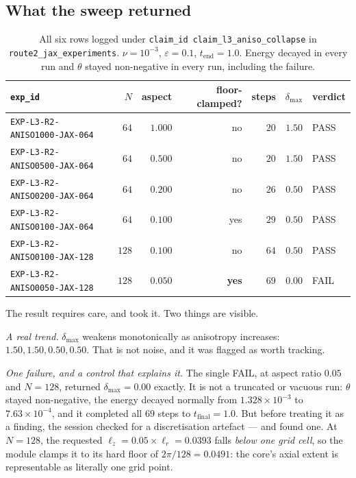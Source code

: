 \subsection{What the sweep returned}

\begin{table}[ht]
\centering
\small
\begin{tabular}{@{}l r r r r r l@{}}
\toprule
\texttt{exp\_id} & \(N\) & aspect & floor-clamped? & steps &
\(\delta_{\max}\) & verdict \\
\midrule
\texttt{EXP-L3-R2-ANISO1000-JAX-064} & \(64\) & \(1.000\) & no & \(20\) & \(1.50\) & \textsf{PASS} \\
\texttt{EXP-L3-R2-ANISO0500-JAX-064} & \(64\) & \(0.500\) & no & \(20\) & \(1.50\) & \textsf{PASS} \\
\texttt{EXP-L3-R2-ANISO0200-JAX-064} & \(64\) & \(0.200\) & no & \(26\) & \(0.50\) & \textsf{PASS} \\
\texttt{EXP-L3-R2-ANISO0100-JAX-064} & \(64\) & \(0.100\) & yes & \(29\) & \(0.50\) & \textsf{PASS} \\
\texttt{EXP-L3-R2-ANISO0100-JAX-128} & \(128\) & \(0.100\) & no & \(64\) & \(0.50\) & \textsf{PASS} \\
\texttt{EXP-L3-R2-ANISO0050-JAX-128} & \(128\) & \(0.050\) & \textbf{yes} & \(69\) & \(\mathbf{0.00}\) & \textsf{FAIL} \\
\bottomrule
\end{tabular}
\caption[The anisotropic-collapse sweep]{All six rows logged under
\texttt{claim\_id}~\texttt{claim\_l3\_aniso\_collapse} in
\texttt{route2\_jax\_experiments}. \(\nu=10^{-3}\), \(\varepsilon=0.1\),
\(t_{\mathrm{end}}=1.0\). Energy decayed in every run and \(\theta\) stayed
non-negative in every run, including the failure.}
\label{tab:aniso}
\end{table}

The result requires care, and  took it. Two things are visible.

\emph{A real trend.} \(\delta_{\max}\) weakens monotonically as anisotropy
increases: \(1.50,1.50,0.50,0.50\). That is not noise, and it was flagged as
worth tracking.

\emph{One failure, and a control that explains it.} The single \textsf{FAIL},
at aspect ratio \(0.05\) and \(N=128\), returned \(\delta_{\max}=0.00\)
exactly. It is not a truncated or vacuous run: \(\theta\) stayed non-negative,
the energy decayed normally from \(1.328\times10^{-3}\) to
\(7.63\times10^{-4}\), and it completed all \(69\) steps to
\(t_{\mathrm{final}}=1.0\). But before treating it as a finding, the session
checked for a discretisation artefact --- and found one. At \(N=128\), the
requested \(\ell_z=0.05\times\ell_r=0.0393\) falls \emph{below one grid cell},
so the module clamps it to its hard floor of \(2\pi/128=0.0491\): the core's
axial extent is representable as literally one grid point.

